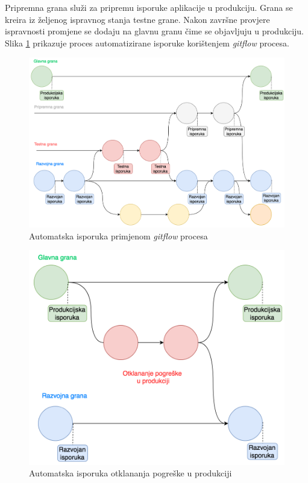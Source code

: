 \documentclass[times, utf8, diplomski, numeric]{fer}
\begin{document}
Pripremna grana služi za pripremu isporuke aplikacije u produkciju. Grana se kreira iz željenog ispravnog stanja testne grane. Nakon završne provjere ispravnosti promjene se dodaju na glavnu granu čime se objavljuju u produkciju. Slika \ref{fig:GitFlowCD} prikazuje proces automatizirane isporuke korištenjem \textit{gitflow} procesa.

\begin{figure}
\centering
\includegraphics[scale=0.5]{GitFlowCD}
\caption{Automatska isporuka primjenom \textit{gitflow} procesa}
\label{fig:GitFlowCD}
\end{figure}

\begin{figure}
\centering
\includegraphics[scale=0.5]{HotfixGitflow}
\caption{Automatska isporuka otklananja pogreške u produkciji}
\label{fig:HotfixGitflow}
\end{figure}
\end{document}
